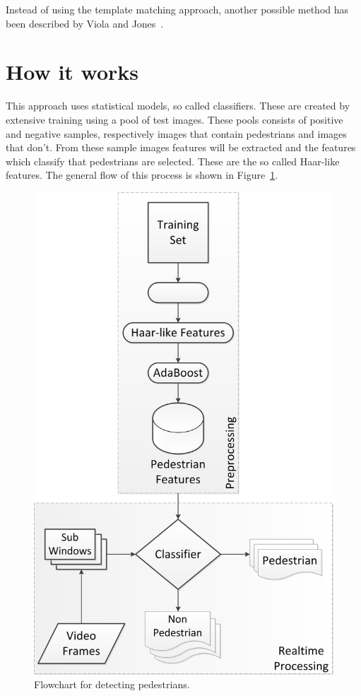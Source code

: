 \documentclass{article}
\begin{document}
Instead of using the template matching approach, another possible method has been described by Viola and Jones~\cite{viola2001rapid}.

\section{How it works}
This approach uses statistical models, so called classifiers. These are created by extensive training using a pool of test images. These pools consists of positive and negative samples, respectively images that contain pedestrians and images that don't. 
From these sample images features will be extracted and the features which classify that pedestrians are selected. These are the so called Haar-like features. The general flow of this process is shown in Figure~\ref{fig:flowchart}.

\begin{figure}[H]
	\centering
	\includegraphics[scale=0.5]{HaarTrainingFlowChart.png}
	\caption{Flowchart for detecting pedestrians.}
	\label{fig:flowchart}
\end{figure}
\end{document}
